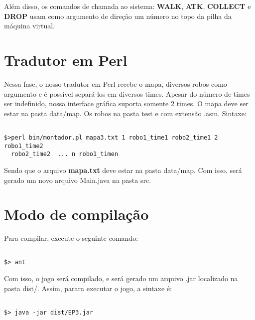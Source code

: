 \documentclass[11pt]{article}
\begin{document}
Além disso, os comandos de chamada ao sistema: \textbf{WALK}, \textbf{ATK}, \textbf{COLLECT} e \textbf{DROP} usam como argumento de direção um número no topo da pilha da máquina virtual.







\section{Tradutor em Perl}

Nessa fase, o nosso tradutor em Perl recebe o mapa, diversos robos como argumento e é possível separá-los em diversos times. Apesar do número de times ser indefinido, nossa interface gráfica suporta somente 2 times. O mapa deve ser estar na pasta data/map. Os robos na pasta test e com extensão .asm.
Sintaxe:

\begin{verbatim}

$>perl bin/montador.pl mapa3.txt 1 robo1_time1 robo2_time1 2 robo1_time2
  robo2_time2  ... n robo1_timen

\end{verbatim}

Sendo que o arquivo \textbf{\color{red}mapa.txt} deve estar na pasta data/map.
Com isso, será gerado um novo arquivo Main.java na pasta src.

\section{Modo de compilação}

Para compilar, execute o seguinte comando:

\begin{verbatim}

$> ant

\end{verbatim}

Com isso, o jogo será compilado, e será gerado um arquivo .jar localizado na pasta dist/. Assim, parara executar o jogo, a sintaxe é:

\begin{verbatim}

$> java -jar dist/EP3.jar

\end{verbatim}
\end{document}
